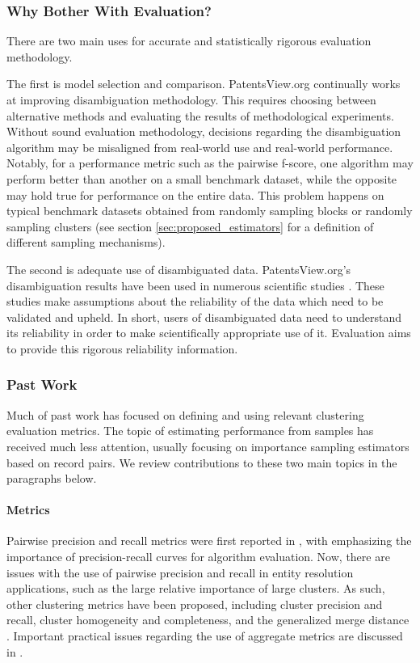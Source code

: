 \documentclass[fontsize=11pt]{article}
\theoremstyle{definition}
\begin{document}
\subsubsection{Why Bother With Evaluation?}

There are two main uses for accurate and statistically rigorous evaluation methodology.

The first is model selection and comparison. PatentsView.org continually works at improving disambiguation methodology. This requires choosing between alternative methods and evaluating the results of methodological experiments. Without sound evaluation methodology, decisions regarding the disambiguation algorithm may be misaligned from real-world use and real-world performance. Notably, for a performance metric such as the pairwise f-score, one algorithm may perform better than another on a small benchmark dataset, while the opposite may hold true for performance on the entire data. This problem happens on typical benchmark datasets obtained from randomly sampling blocks or randomly sampling clusters (see section \ref{sec:proposed_estimators} for a definition of different sampling mechanisms).

The second is adequate use of disambiguated data. PatentsView.org's disambiguation results have been used in numerous scientific studies \citep{toole2021patentsview}. These studies make assumptions about the reliability of the data which need to be validated and upheld. In short, users of disambiguated data need to understand its reliability in order to make scientifically appropriate use of it. Evaluation aims to provide this rigorous reliability information.

\subsubsection{Past Work}

Much of past work has focused on defining and using relevant clustering evaluation metrics. The topic of estimating performance from samples has received much less attention, usually focusing on importance sampling estimators based on record pairs. We review contributions to these two main topics in the paragraphs below.

\paragraph{Metrics}

Pairwise precision and recall metrics were first reported in \cite{Newcombe1959}, with \cite{Bilenko2003, Christen2007} emphasizing the importance of precision-recall curves for algorithm evaluation. Now, there are issues with the use of pairwise precision and recall in entity resolution applications, such as the large relative importance of large clusters. As such, other clustering metrics have been proposed, including cluster precision and recall, cluster homogeneity and completeness, and the generalized merge distance \citep{Michelson2009, Menestrina2010, Maidasani2012, Barnes2015}. Important practical issues regarding the use of aggregate metrics are discussed in \cite{Hand2018}.
\end{document}
